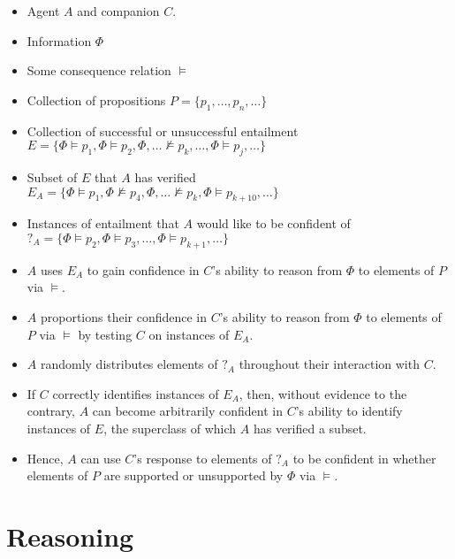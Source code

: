 \documentclass[10pt]{article}
\begin{document}
\begin{itemize}
\item Agent \(A\) and companion \(C\).
\item Information \(\Phi\)
\item Some consequence relation \(\vDash\)
\item Collection of propositions \(P = \{p_{1},\dots,p_{n},\dots\}\)
\item Collection of successful or unsuccessful entailment \(E = \{\Phi \vDash p_{1}, \Phi \vDash p_{2}, \Phi,\dots \nvDash p_{k}, \dots, \Phi \vDash p_{j}, \dots\}\)
\item Subset of \(E\) that \(A\) has verified \(E_{A} = \{\Phi \vDash p_{1}, \Phi \nvDash p_{4}, \Phi,\dots \nvDash p_{k}, \Phi \vDash p_{k+10}, \dots\}\)
\item Instances of entailment that \(A\) would like to be confident of \(?_{A} = \{\Phi \vDash p_{2}, \Phi \vDash p_{3}, \dots, \Phi \vDash p_{k+1},\dots\}\)
\end{itemize}

\begin{itemize}
\item \(A\) uses \(E_{A}\) to gain confidence in \(C\)'s ability to reason from \(\Phi\) to elements of \(P\) via \(\vDash\).
\item \(A\) proportions their confidence in \(C\)'s ability to reason from \(\Phi\) to elements of \(P\) via \(\vDash\) by testing \(C\) on instances of \(E_{A}\).
\item \(A\) randomly distributes elements of \(?_{A}\) throughout their interaction with \(C\).
\end{itemize}

\begin{itemize}
\item If \(C\) correctly identifies instances of \(E_{A}\), then, without evidence to the contrary, \(A\) can become arbitrarily confident in \(C\)'s ability to identify instances of \(E\), the superclass of which \(A\) has verified a subset.
\item Hence, \(A\) can use \(C\)'s response to elements of \(?_{A}\) to be confident in whether elements of \(P\) are supported or unsupported by \(\Phi\) via \(\vDash\).
\end{itemize}

\section{Reasoning}
\label{sec:reasoning}
\end{document}
